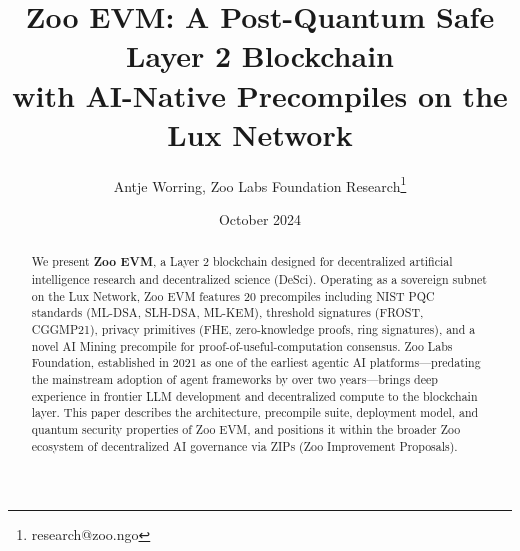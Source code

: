 \documentclass[11pt,a4paper]{article}
\title{\textbf{Zoo EVM: A Post-Quantum Safe Layer 2 Blockchain\\with AI-Native Precompiles on the Lux Network}}
\author[1]{Antje Worring, Zoo Labs Foundation Research\thanks{research@zoo.ngo}}
\affil[1]{\textit{Zoo Labs Foundation \quad Hanzo Industries \quad Lux Industries}, \texttt{research@zoo.ngo}}
\date{October 2024}
\begin{document}
\zoocoverpage

\begin{abstract}
We present \textbf{Zoo EVM}, a Layer 2 blockchain designed for decentralized artificial intelligence research and decentralized science (DeSci). Operating as a sovereign subnet on the Lux Network, Zoo EVM features 20 precompiles including NIST PQC standards (ML-DSA, SLH-DSA, ML-KEM), threshold signatures (FROST, CGGMP21), privacy primitives (FHE, zero-knowledge proofs, ring signatures), and a novel AI Mining precompile for proof-of-useful-computation consensus. Zoo Labs Foundation, established in 2021 as one of the earliest agentic AI platforms---predating the mainstream adoption of agent frameworks by over two years---brings deep experience in frontier LLM development and decentralized compute to the blockchain layer. This paper describes the architecture, precompile suite, deployment model, and quantum security properties of Zoo EVM, and positions it within the broader Zoo ecosystem of decentralized AI governance via ZIPs (Zoo Improvement Proposals).
\end{abstract}









\end{document}
